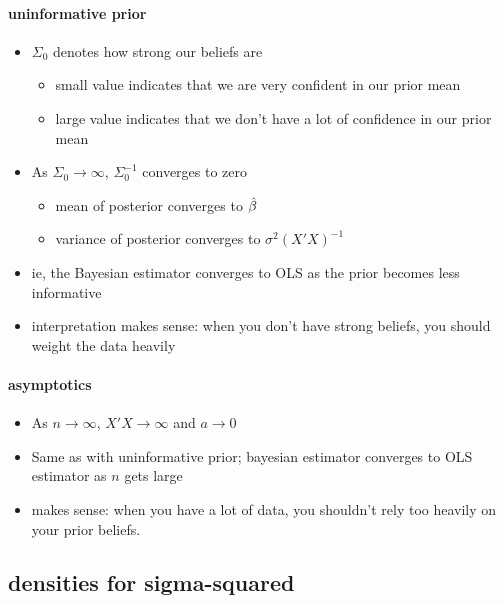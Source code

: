 \paragraph{uninformative prior}
\begin{itemize}
\item $\Sigma_0$ denotes how strong our beliefs are
\begin{itemize}
\item small value indicates that we are very confident in our
           prior mean
\item large value indicates that we don't have a lot of
           confidence in our prior mean
\end{itemize}
\item As $\Sigma_0 \to \infty$, $\Sigma_0^{-1}$ converges to zero
\begin{itemize}
\item mean of posterior converges to $\hat{\beta}$
\item variance of posterior converges to $\sigma^2(X'X)^{-1}$
\end{itemize}
\item ie, the Bayesian estimator converges to OLS as the prior
         becomes less informative
\item interpretation makes sense: when you don't have strong
         beliefs, you should weight the data heavily
\end{itemize}

\paragraph{asymptotics}
\begin{itemize}
\item As $n \to \infty$, $X'X \to \infty$ and $a \to 0$
\item Same as with uninformative prior; bayesian estimator
         converges to OLS estimator as $n$ gets large
\item makes sense: when you have a lot of data, you shouldn't rely
         too heavily on your prior beliefs.
\end{itemize}

\subsection{densities for sigma-squared}

